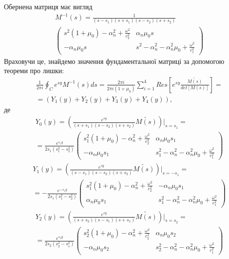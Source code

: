 Обернена матриця має вигляд
\begin{align}
    &M^{-1}(s)= \frac{1}{(s - s_1)(s + s_1)(s - s_2)(s + s_2)} \nonumber \\
    &\begin{pmatrix}
        s^2 (1 + \mu_0) -\alpha_n^2 + \frac{\omega^2}{c_2^2} & \alpha_n \mu_0 s \\
        -\alpha_n \mu_0 s & s^2 - \alpha_n^2 - \alpha_n^2\mu_0 + \frac{\omega^2}{c_1^2}
    \end{pmatrix}
\end{align}
Враховучи це, знайдемо значення фундаментальної матриці за допомогою теореми про лишки:
\begin{align*}
    &\frac{1}{2\pi i} \oint_C e^{sy} M^{-1}(s)ds = \frac{2 \pi i}{2 \pi i (1 + \mu_0)} \sum_{i=1}^{4} Res\left[ e^{sy} \frac{\widetilde{M(s)}}{det[M(s)]} \right] = \\
    & = \left(Y_1(y) + Y_2(y) + Y_3(y) + Y_4(y) \right),
\end{align*}
де
\begin{align}\label{fund_mat_0_gen}
    &Y_0(y) =  \left( \frac{e^{sy}}{(s+s_1)(s - s_2)(s + s_2)} \widetilde{M(s)} \right) \Big|_{s=s_1} = \nonumber \\
    &=\frac{e^{s_1 y}}{2s_1 (s_1^2 - s_2^2)} \begin{pmatrix}
        s_1^2 (1 + \mu_0) -\alpha_n^2 + \frac{\omega^2}{c_2^2} & \alpha_n \mu_0 s_1 \\
        -\alpha_n \mu_0 s_1 & s_1^2 - \alpha_n^2 - \alpha_n^2\mu_0 + \frac{\omega^2}{c_1^2}
    \end{pmatrix}
\end{align}
\begin{align}\label{fund_mat_1_gen}
    &Y_1(y) =  \left( \frac{e^{sy}}{(s-s_1)(s - s_2)(s + s_2)} \widetilde{M(s)} \right) \Big|_{s=-s_1} = \nonumber \\
    &=-\frac{e^{-s_1 y}}{2s_1 (s_1^2 - s_2^2)} \begin{pmatrix}
        s_1^2 (1 + \mu_0) -\alpha_n^2 + \frac{\omega^2}{c_2^2} & -\alpha_n \mu_0 s_1 \\
        \alpha_n \mu_0 s_1 & s_1^2 - \alpha_n^2 - \alpha_n^2\mu_0 + \frac{\omega^2}{c_1^2}
    \end{pmatrix}
\end{align}
\begin{align}\label{fund_mat_2_gen}
    &Y_2(y) =  \left( \frac{e^{sy}}{(s+s_2)(s - s_1)(s + s_1)} \widetilde{M(s)} \right) \Big|_{s=s_2} = \nonumber \\
    &=\frac{e^{s_2 y}}{2s_2 (s_2^2 - s_1^2)} \begin{pmatrix}
        s_2^2 (1 + \mu_0) -\alpha_n^2 + \frac{\omega^2}{c_2^2} & \alpha_n \mu_0 s_2 \\
        -\alpha_n \mu_0 s_2 & s_2^2 - \alpha_n^2 - \alpha_n^2\mu_0 + \frac{\omega^2}{c_1^2}
    \end{pmatrix}
\end{align}
